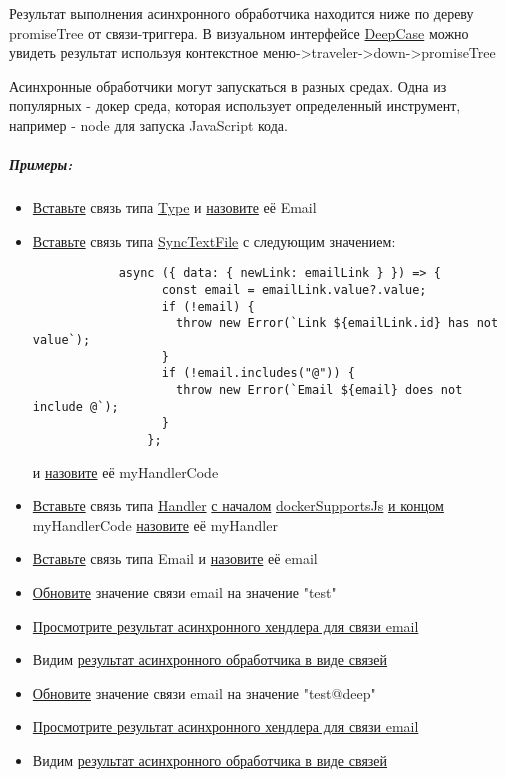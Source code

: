 \documentclass{article}
\begin{document}
\hypertarget{Handlers.Async.HowToGetResult}{}Результат выполнения асинхронного
обработчика находится ниже по дереву
promiseTree от связи-триггера. В визуальном интерфейсе
\hyperlink{DeepCase.Description}{DeepCase} можно увидеть
результат используя контекстное меню->traveler->down->promiseTree

Асинхронные обработчики могут запускаться в разных средах. Одна из популярных -
докер среда, которая использует определенный инструмент, например - node для
запуска JavaScript кода.
\subparagraph{Примеры:}
\begin{itemize}
  \item \hyperlink{DeepCase.InsertLink.Description}{Вставьте} связь типа
        \hyperlink{Core.Type.Description}{Type} и
        \hyperlink{FAQ.HowToSetName}{назовите} её Email
  \item \hyperlink{DeepCase.InsertLink.Description}{Вставьте} связь типа
        \hyperlink{Core.SyncTextFile.Description}{SyncTextFile} с следующим
        значением:
        \begin{lstlisting}
            async ({ data: { newLink: emailLink } }) => {
                  const email = emailLink.value?.value;
                  if (!email) {
                    throw new Error(`Link ${emailLink.id} has not value`);
                  }
                  if (!email.includes("@")) {
                    throw new Error(`Email ${email} does not include @`);
                  }
                };
            \end{lstlisting}
        и \hyperlink{FAQ.HowToSetName}{назовите} её myHandlerCode
  \item \hyperlink{DeepCase.InsertLink.Description}{Вставьте} связь типа
        \hyperlink{Core.Handler.Description}{Handler} \hyperlink{FAQ.HowToInsertLinkWithFromAndTo}{с началом}
        \hyperlink{Core.dockerSupportsJs.Description}{dockerSupportsJs} \hyperlink{FAQ.HowToInsertLinkWithFromAndTo}{и
        концом}
        myHandlerCode \hyperlink{FAQ.HowToSetName}{назовите} её myHandler
  \item \hyperlink{DeepCase.InsertLink.Description}{Вставьте} связь типа
        Email и \hyperlink{FAQ.HowToSetName}{назовите} её email
  \item \hyperlink{DeepCase.UpdateLink.Description}{Обновите} значение
        связи email на значение "test"
  \item \hyperlink{Handlers.Async.HowToGetResult}{Просмотрите результат
          асинхронного хендлера для связи email}
  \item Видим \hyperlink{Handlers.Async.Result}{результат асинхронного
          обработчика в виде связей}
  \item \hyperlink{DeepCase.UpdateLink.Description}{Обновите} значение
        связи email на значение "test@deep"
  \item \hyperlink{Handlers.Async.HowToGetResult}{Просмотрите результат
          асинхронного хендлера для связи email}
  \item Видим \hyperlink{Handlers.Async.Result}{результат асинхронного
          обработчика в виде связей}
\end{itemize}
\end{document}
